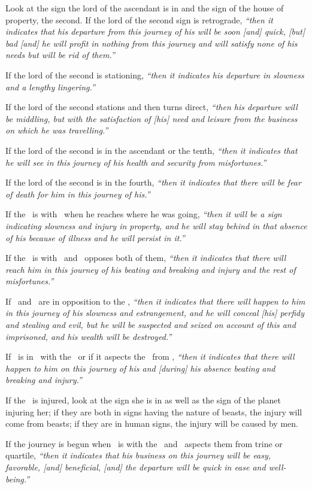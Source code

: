 Look at the sign the lord of the ascendant is in and the sign of the house of property, the second. If the lord of the second sign is retrograde, \textsl{``then it indicates that his departure from this journey of his will be soon [and] quick, [but] bad [and] he will profit in nothing from this journey and will satisfy none of his needs but will be rid of them.''}

If the lord of the second is stationing, \textsl{``then it indicates his departure in slowness and a lengthy lingering.''}

If the lord of the second stations and then turns direct, \textsl{``then his departure will be middling, but with the satisfaction of [his] need and leisure from the business on which he was travelling.''}

If the lord of the second is in the ascendant or the tenth, \textsl{``then it indicates that he will see in this journey of his health and security from misfortunes.''}

If the lord of the second is in the fourth, \textsl{``then it indicates that there will be fear of death for him in this journey of his.''}

If the \Moon\, is with \Saturn\, when he reaches where he was going, \textsl{``then it will be a sign indicating slowness and injury in property, and he will stay behind in that absence of his because of illness and he will persist in it.''}

If the \Moon\, is with \Mercury\, and \Mars\, opposes both of them, \textsl{``then it indicates that there will reach him in this journey of his beating and breaking and injury and the rest of misfortunes.''}

If \Mercury\, and \Saturn\, are in opposition to the \Moon, \textsl{``then it indicates that there will happen to him in this journey of his slowness and estrangement, and he will conceal [his] perfidy and stealing and evil, but he will be suspected and seized on account of this and imprisoned, and his wealth will be destroyed.''}

If \Mars\, is in \Sagittarius\, with the \Moon\, or if it aspects the \Moon\, from \Sagittarius, \textsl{``then it indicates that there will happen to him on this journey of his and [during] his absence beating and breaking and injury.''}

If the \Moon\, is injured, look at the sign she is in as well as the sign of the planet injuring her; if they are both in signs having the nature of beasts, the injury will come from beasts; if they are in human signs, the injury will be caused by men.

If the journey is begun when \Mercury\, is with the \Moon\, and \Jupiter\, aspects them from trine or quartile, \textsl{``then it indicates that his business on this journey will be easy, favorable, [and] beneficial, [and] the departure will be quick in ease and well-being.''}






